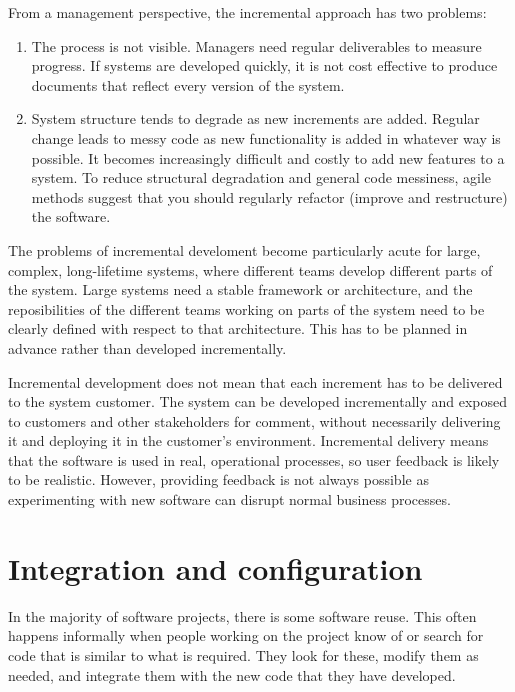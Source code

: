 From a management perspective, the incremental approach has two problems:
\begin{enumerate}
    \item The process is not visible. Managers need regular deliverables to measure progress. If systems are developed quickly, it is not cost effective to produce documents that reflect every version of the system.
    \item System structure tends to degrade as new increments are added. Regular change leads to messy code as new functionality is added in whatever way is possible. It becomes increasingly difficult and costly to add new features to a system. To reduce structural degradation and general code messiness, agile methods suggest that you should regularly refactor (improve and restructure) the software.
\end{enumerate}

The problems of incremental develoment become particularly acute for large, complex, long-lifetime systems, where different teams develop different parts of the system. Large systems need a stable framework or architecture, and the reposibilities of the different teams working on parts of the system need to be clearly defined with respect to that architecture. This has to be planned in advance rather than developed incrementally.

Incremental development does not mean that each increment has to be delivered to the system customer. The system can be developed incrementally and exposed to customers and other stakeholders for comment, without necessarily delivering it and deploying it in the customer's environment. Incremental delivery means that the software is used in real, operational processes, so user feedback is likely to be realistic. However, providing feedback is not always possible as experimenting with new software can disrupt normal business processes.

\section{Integration and configuration}
In the majority of software projects, there is some software reuse. This often happens informally when people working on the project know of or search for code that is similar to what is required. They look for these, modify them as needed, and integrate them with the new code that they have developed.

